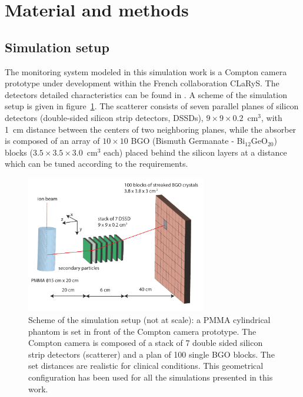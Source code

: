 
\section{Material and methods}

\subsection{Simulation setup}

The monitoring system modeled in this simulation work is a Compton camera prototype under development within the French collaboration CLaRyS. The detectors detailed characteristics can be found in \cite{krimmer:hal-01101334}. A scheme of the simulation setup is given in figure~\ref{fig:fig_setup_CC_simulation_Hadronth}.
The scatterer consists of seven parallel planes of silicon detectors (double-sided silicon strip detectors, DSSDs), $9\times9\times0.2$~cm$^3$, with 1~cm distance between the centers of two neighboring planes, while the absorber is composed of an array of $10\times10$ BGO (Bismuth Germanate - Bi$_{12}$GeO$_{20}$) blocks ($3.5\times3.5\times3.0$~cm$^3$ each) placed behind the silicon layers at a distance which can be tuned according to the requirements.

\begin{figure}	
  \centering
  \includegraphics[width=0.7\textwidth]{./Figure/Compton_Camera_hadontherapy_PMMA_Cylinder_EN.pdf}
  \caption{Scheme of the simulation setup (not at scale): a PMMA cylindrical phantom is set in front of the Compton camera prototype. The Compton camera is composed of a stack of 7 double sided silicon strip detectors (scatterer) and a plan of 100 single BGO blocks. The set distances are realistic for clinical conditions. This geometrical configuration has been used for all the simulations presented in this work.}
  \label{fig:fig_setup_CC_simulation_Hadronth}
\end{figure}

